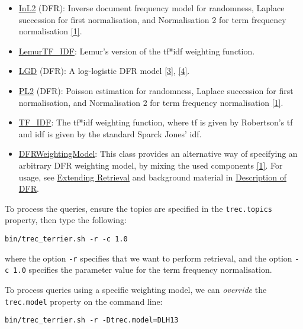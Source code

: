 \begin{itemize}
\item
  \href{javadoc/org/terrier/matching/models/InL2.html}{InL2} (DFR):
  Inverse document frequency model for randomness, Laplace succession
  for first normalisation, and Normalisation 2 for term frequency
  normalisation \protect\hyperlink{cite1}{{[}1{]}}.
\item
  \href{javadoc/org/terrier/matching/models/LemurTF_IDF.html}{LemurTF\_IDF}:
  Lemur's version of the tf*idf weighting function.
\item
  \href{javadoc/org/terrier/matching/models/LGD.html}{LGD} (DFR): A
  log-logistic DFR model \protect\hyperlink{cite3}{{[}3{]}},
  \protect\hyperlink{cite4}{{[}4{]}}.
\item
  \href{javadoc/org/terrier/matching/models/PL2.html}{PL2} (DFR):
  Poisson estimation for randomness, Laplace succession for first
  normalisation, and Normalisation 2 for term frequency normalisation
  \protect\hyperlink{cite1}{{[}1{]}}.
\item
  \href{javadoc/org/terrier/matching/models/TF_IDF.html}{TF\_IDF}: The
  tf*idf weighting function, where tf is given by Robertson's tf and idf
  is given by the standard Sparck Jones' idf.
\item
  \href{javadoc/org/terrier/matching/models/DFRWeightingModel.html}{DFRWeightingModel}:
  This class provides an alternative way of specifying an arbitrary DFR
  weighting model, by mixing the used components
  \protect\hyperlink{cite1}{{[}1{]}}. For usage, see
  \href{extend_retrieval.html}{Extending Retrieval} and background
  material in \href{dfr_description.html}{Description of DFR}.
\end{itemize}

To process the queries, ensure the topics are specified in the
\texttt{trec.topics} property, then type the following:

\begin{verbatim}
bin/trec_terrier.sh -r -c 1.0 
\end{verbatim}

where the option \texttt{-r} specifies that we want to perform
retrieval, and the option \texttt{-c\ 1.0} specifies the parameter value
for the term frequency normalisation.

To process queries using a specific weighting model, we can
\emph{override} the \texttt{trec.model} property on the command line:

\begin{verbatim}
bin/trec_terrier.sh -r -Dtrec.model=DLH13
\end{verbatim}

